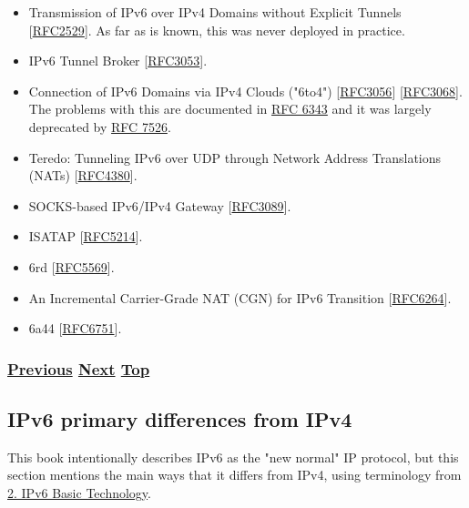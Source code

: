 \documentclass[
]{article}
\begin{document}
\begin{itemize}
\item
  Transmission of IPv6 over IPv4 Domains without Explicit Tunnels
  {[}\href{https://www.rfc-editor.org/info/rfc2529}{RFC2529}{]}. As far
  as is known, this was never deployed in practice.
\item
  IPv6 Tunnel Broker
  {[}\href{https://www.rfc-editor.org/info/rfc3053}{RFC3053}{]}.
\item
  Connection of IPv6 Domains via IPv4 Clouds ("6to4")
  {[}\href{https://www.rfc-editor.org/info/rfc3056}{RFC3056}{]}
  {[}\href{https://www.rfc-editor.org/info/rfc3068}{RFC3068}{]}. The
  problems with this are documented in
  \href{https://www.rfc-editor.org/info/rfc6343}{RFC 6343} and it was
  largely deprecated by
  \href{https://www.rfc-editor.org/info/rfc7526}{RFC 7526}.
\item
  Teredo: Tunneling IPv6 over UDP through Network Address Translations
  (NATs) {[}\href{https://www.rfc-editor.org/info/rfc4380}{RFC4380}{]}.
\item
  SOCKS-based IPv6/IPv4 Gateway
  {[}\href{https://www.rfc-editor.org/info/rfc3089}{RFC3089}{]}.
\item
  ISATAP {[}\href{https://www.rfc-editor.org/info/rfc5214}{RFC5214}{]}.
\item
  6rd {[}\href{https://www.rfc-editor.org/info/rfc5569}{RFC5569}{]}.
\item
  An Incremental Carrier-Grade NAT (CGN) for IPv6 Transition
  {[}\href{https://www.rfc-editor.org/info/rfc6264}{RFC6264}{]}.
\item
  6a44 {[}\href{https://www.rfc-editor.org/info/rfc6751}{RFC6751}{]}.
\end{itemize}

\subsubsection{\texorpdfstring{\hyperref[translation-and-ipv4-as-a-service]{Previous}
\hyperref[ipv6-primary-differences-from-ipv4]{Next}
\hyperref[coexistence-with-legacy-ipv4]{Top}}{Previous Next Top}}\label{previous-next-top-21}

\pagebreak

\subsection{IPv6 primary differences from
IPv4}\label{ipv6-primary-differences-from-ipv4}

This book intentionally describes IPv6 as the "new normal" IP protocol,
but this section mentions the main ways that it differs from IPv4, using
terminology from \hyperref[ipv6-basic-technology]{2. IPv6 Basic
Technology}.
\end{document}
